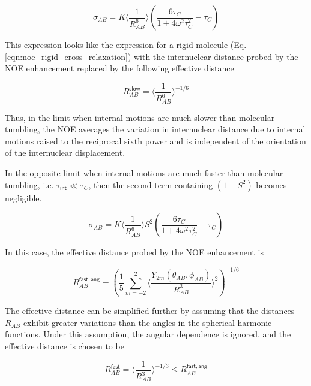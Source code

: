 \documentclass[9pt,review]{livecoms}
\begin{document}
\begin{equation}
\label{eqn:ls_slow_cross_relaxation}
\sigma_{AB} = K \langle \frac {1} {R_{AB}^6} \rangle \left( \frac {6 \tau_C} {1 + 4 \omega^2 \tau_C^2} - \tau_C \right)
\end{equation}

\noindent This expression looks like the expression for a rigid molecule (Eq. \ref{eqn:noe_rigid_cross_relaxation}) with the internuclear distance probed by the NOE enhancement replaced by the following effective distance

\begin{equation}
\label{eqn:ls_slow_effective_distance}
R_{AB}^{\mathsf{slow}} = \langle \frac {1} {R_{AB}^6} \rangle^{-1/6}
\end{equation}

\noindent Thus, in the limit when internal motions are much slower than molecular tumbling, the NOE averages the variation in internuclear distance due to internal motions raised to the reciprocal sixth power and is independent of the orientation of the internuclear displacement.

In the opposite limit when internal motions are much faster than molecular tumbling, i.e. $\tau_{\mathsf{int}} \ll \tau_C$, then the second term containing $(1 - S^2)$ becomes negligible.

\begin{equation}
\label{eqn:ls_fast_cross_relaxation}
\sigma_{AB} = K \langle \frac {1} {R_{AB}^6} \rangle S^2 \left( \frac {6 \tau_C} {1 + 4 \omega^2 \tau_C^2} - \tau_C \right)
\end{equation}

\noindent In this case, the effective distance probed by the NOE enhancement is

\begin{equation}
\label{eqn:ls_fast_effective_distance_angular}
R_{AB}^{\mathsf{fast,ang}} = \left( \frac {1} {5} \sum_{m=-2}^2 \langle \frac {Y_{2m}(\theta_{AB}, \phi_{AB})} {R_{AB}^3} \rangle^2 \right)^{-1/6}
\end{equation}

\noindent The effective distance can be simplified further by assuming that the distances $R_{AB}$ exhibit greater variations than the angles in the spherical harmonic functions.
Under this assumption, the angular dependence is ignored, and the effective distance is chosen to be

\begin{equation}
\label{eqn:ls_fast_effective_distance}
R_{AB}^{\mathsf{fast}} = \langle \frac {1} {R_{AB}^3} \rangle^{-1/3} \leq R_{AB}^{\mathsf{fast,ang}}
\end{equation}
\end{document}
